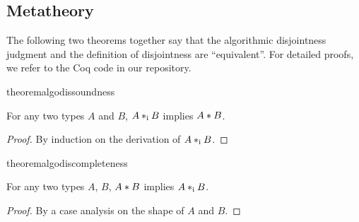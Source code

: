 \subsection{Metatheory}

The following two theorems together say that the algorithmic disjointness
judgment and the definition of disjointness are ``equivalent''. For detailed
proofs, we refer to the Coq code in our repository.

\begin{restatable}{theorem}{algodissoundness}
  \label{theorem:soundness}

  For any two types $A$ and $B$, $A *_\textnormal{i} B$ implies $A * B$.
\end{restatable}

\begin{proof}
  By induction on the derivation of $A *_\textnormal{i} B$.
\end{proof}

\begin{restatable}{theorem}{algodiscompleteness}
  \label{theorem:completeness}

  For any two types $A$, $B$, $A * B$ implies $A *_\textnormal{i} B$.
\end{restatable}

\begin{proof}
  By a case analysis on the shape of $A$ and $B$.
\end{proof}
